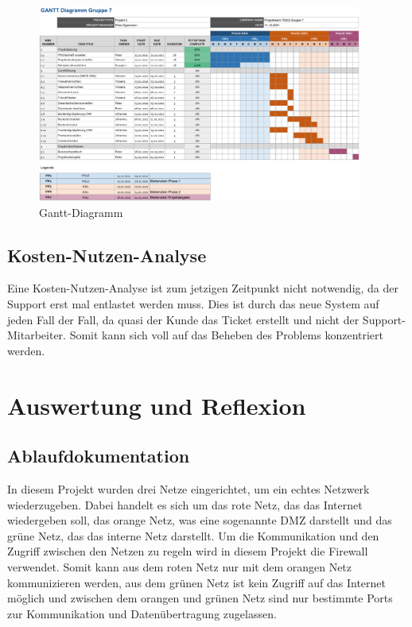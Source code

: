 \documentclass[a4paper,
    11pt,
    headings=small,
    ngerman,
    listof=totoc,
    numbers=noenddot]{scrreprt}[2021/11/13]
\begin{document}
\begin{figure}[htbp]
  \centering
  \includegraphics[width=0.95\textwidth]{data/Gantt.png}
  \caption{Gantt-Diagramm}
  \label{fig:GanttKlein}
\end{figure}


\section{Kosten-Nutzen-Analyse}

Eine Kosten-Nutzen-Analyse ist zum jetzigen Zeitpunkt nicht notwendig, da der Support erst mal entlastet werden muss. Dies ist durch das neue System auf jeden Fall der Fall, da quasi der Kunde das Ticket erstellt und nicht der Support-Mitarbeiter. Somit kann sich voll auf das Beheben des Problems konzentriert werden.


\chapter{Auswertung und Reflexion}

\section{Ablaufdokumentation}

In diesem Projekt wurden drei Netze eingerichtet, um ein echtes Netzwerk wiederzugeben. Dabei handelt es sich um das rote Netz, das das Internet wiedergeben soll, das orange Netz, was eine sogenannte \ac{DMZ} darstellt und das grüne Netz, das das interne Netz darstellt.
Um die Kommunikation und den Zugriff zwischen den Netzen zu regeln wird in diesem Projekt die Firewall verwendet. Somit kann aus dem roten Netz nur mit dem orangen Netz kommunizieren werden, aus dem grünen Netz ist kein Zugriff auf das Internet möglich und zwischen dem orangen und grünen Netz sind nur bestimmte Ports zur Kommunikation und Datenübertragung zugelassen.
\end{document}
